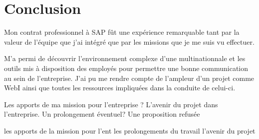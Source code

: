 \chapter*{Conclusion}
Mon contrat professionnel à SAP fût une expérience remarquable tant par la valeur de l'équipe que j'ai intégré que par les missions que je me suis vu effectuer. 

M'a permi de découvrir l'environnement complexe d'une multinationnale et les outils mis à disposition des employés pour permettre une bonne communication au sein de l'entreprise.
J'ai pu me rendre compte de l'ampleur d'un projet comme WebI ainsi que toutes les ressources impliquées dans la conduite de celui-ci.

Les apports de ma mission pour l'entreprise ?
L'avenir du projet dans l'entreprise.
Un prolongement éventuel? Une proposition refusée


les apports de la mission pour l'ent
les prolongements du travail
l'avenir du projet